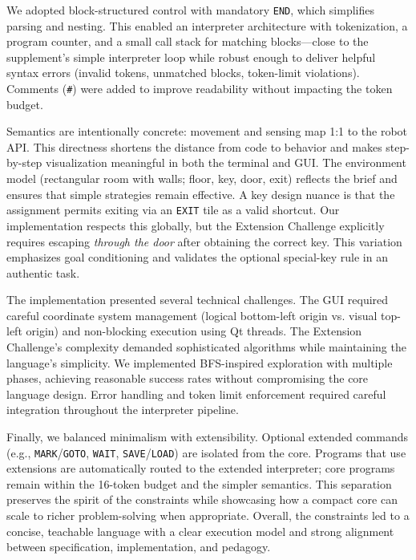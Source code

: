 \documentclass[11pt,a4paper]{article}
\begin{document}
We adopted block-structured control with mandatory \texttt{END}, which simplifies parsing and nesting. This enabled an interpreter architecture with tokenization, a program counter, and a small call stack for matching blocks—close to the supplement's simple interpreter loop while robust enough to deliver helpful syntax errors (invalid tokens, unmatched blocks, token-limit violations). Comments (\texttt{\#}) were added to improve readability without impacting the token budget.

Semantics are intentionally concrete: movement and sensing map 1:1 to the robot API. This directness shortens the distance from code to behavior and makes step-by-step visualization meaningful in both the terminal and GUI. The environment model (rectangular room with walls; floor, key, door, exit) reflects the brief and ensures that simple strategies remain effective. A key design nuance is that the assignment permits exiting via an \texttt{EXIT} tile as a valid shortcut. Our implementation respects this globally, but the Extension Challenge explicitly requires escaping \emph{through the door} after obtaining the correct key. This variation emphasizes goal conditioning and validates the optional special-key rule in an authentic task.

The implementation presented several technical challenges. The GUI required careful coordinate system management (logical bottom-left origin vs. visual top-left origin) and non-blocking execution using Qt threads. The Extension Challenge's complexity demanded sophisticated algorithms while maintaining the language's simplicity. We implemented BFS-inspired exploration with multiple phases, achieving reasonable success rates without compromising the core language design. Error handling and token limit enforcement required careful integration throughout the interpreter pipeline.

Finally, we balanced minimalism with extensibility. Optional extended commands (e.g., \texttt{MARK}/\texttt{GOTO}, \texttt{WAIT}, \texttt{SAVE}/\texttt{LOAD}) are isolated from the core. Programs that use extensions are automatically routed to the extended interpreter; core programs remain within the 16-token budget and the simpler semantics. This separation preserves the spirit of the constraints while showcasing how a compact core can scale to richer problem-solving when appropriate. Overall, the constraints led to a concise, teachable language with a clear execution model and strong alignment between specification, implementation, and pedagogy.
\end{document}
